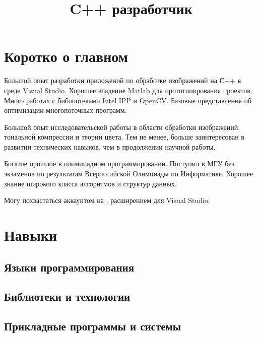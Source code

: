 \documentclass[11pt,a4paper,final]{moderncv}
\title{C++ разработчик}                               %
\begin{document}
\maketitle

\section{Коротко о главном}

Большой опыт разработки приложений по обработке изображений на С++ в среде Visual Studio. Хорошее владение Matlab для прототипирования проектов. Много работал с библиотеками Intel IPP и OpenCV. Базовые представления об оптимизации многопоточных программ.

Большой опыт исследовательской работы в области обработки изображений, тональной компрессии и теории цвета. Тем не менее, больше заинтересован в развитии технических навыков, чем в продолжении научной работы.

Богатое прошлое в олимпиадном программировании. Поступил в МГУ без экзаменов по результатам Всероссийской Олимпиады по Информатике. Хорошее знание широкого класса алгоритмов и структур данных.

Могу похвастаться аккаунтом на , расширением  для Visual Studio.

\section{Навыки}

\subsection{Языки программирования}


\subsection{Библиотеки и технологии}


\subsection{Прикладные программы и системы}
\end{document}
